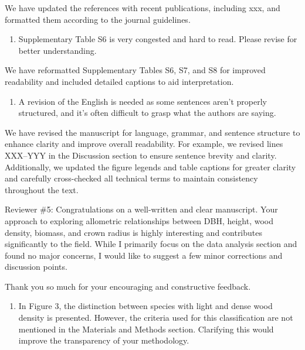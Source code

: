 \documentclass[
  12pt,
  letterpaper,
  DIV=11,
  numbers=noendperiod]{scrartcl}
\providecommand{\tightlist}{%
  \setlength{\itemsep}{0pt}\setlength{\parskip}{0pt}}\usepackage{longtable,booktabs,array}
\renewenvironment{quote}
  {\begin{customblockquote}\color{blockquote-text}\ignorespaces}
  {\end{customblockquote}}
\begin{document}
We have updated the references with recent publications, including xxx,
and formatted them according to the journal guidelines.

\begin{quote}
\begin{enumerate}
\def\labelenumi{\arabic{enumi})}
\setcounter{enumi}{7}
\tightlist
\item
  Supplementary Table S6 is very congested and hard to read. Please
  revise for better understanding.
\end{enumerate}
\end{quote}

We have reformatted Supplementary Tables S6, S7, and S8 for improved
readability and included detailed captions to aid interpretation.

\begin{quote}
\begin{enumerate}
\def\labelenumi{\arabic{enumi})}
\setcounter{enumi}{8}
\tightlist
\item
  A revision of the English is needed as some sentences aren't properly
  structured, and it's often difficult to grasp what the authors are
  saying.
\end{enumerate}
\end{quote}

We have revised the manuscript for language, grammar, and sentence
structure to enhance clarity and improve overall readability. For
example, we revised lines XXX--YYY in the Discussion section to ensure
sentence brevity and clarity. Additionally, we updated the figure
legends and table captions for greater clarity and carefully
cross-checked all technical terms to maintain consistency throughout the
text.

\begin{quote}
Reviewer \#5: Congratulations on a well-written and clear manuscript.
Your approach to exploring allometric relationships between DBH, height,
wood density, biomass, and crown radius is highly interesting and
contributes significantly to the field. While I primarily focus on the
data analysis section and found no major concerns, I would like to
suggest a few minor corrections and discussion points.
\end{quote}

Thank you so much for your encouraging and constructive feedback.

\begin{quote}
\begin{enumerate}
\def\labelenumi{\arabic{enumi})}
\tightlist
\item
  In Figure 3, the distinction between species with light and dense wood
  density is presented. However, the criteria used for this
  classification are not mentioned in the Materials and Methods section.
  Clarifying this would improve the transparency of your methodology.
\end{enumerate}
\end{quote}
\end{document}
